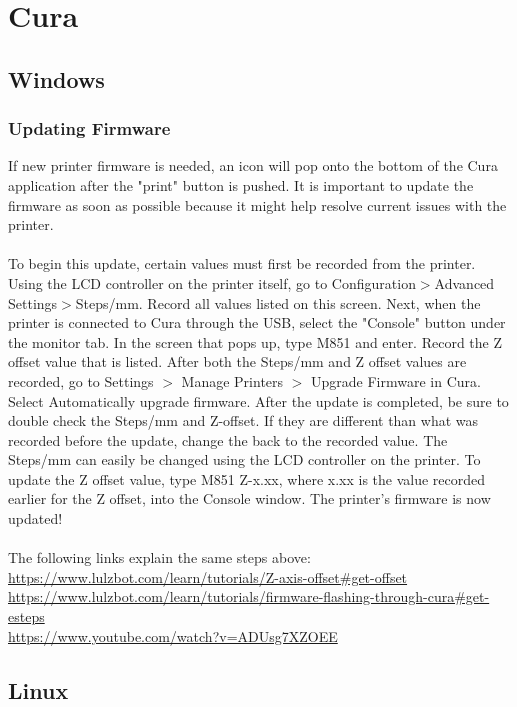 \documentclass{article}
\begin{document}
\section{Cura}

\subsection{Windows}

\subsubsection{Updating Firmware}

If new printer firmware is needed, an icon will pop onto the bottom of the Cura application after the "print" button is pushed. It is important to update the firmware as soon as possible because it might help resolve current issues with the printer. 
\\
\\To begin this update, certain values must first be recorded from the printer. Using the LCD controller on the printer itself, go to Configuration$>$Advanced Settings$>$Steps/mm. Record all values listed on this screen. Next, when the printer is connected to Cura through the USB, select the "Console" button under the monitor tab. In the screen that pops up, type M851 and enter. Record the Z offset value that is listed. After both the Steps/mm and Z offset values are recorded, go to Settings $>$ Manage Printers $>$ Upgrade Firmware in Cura. Select Automatically upgrade firmware. After the update is completed, be sure to double check the Steps/mm and Z-offset. If they are different than what was recorded before the update, change the back to the recorded value. The Steps/mm can easily be changed using the LCD controller on the printer. To update the Z offset value, type M851 Z-x.xx, where x.xx is the value recorded earlier for the Z offset, into the Console window. The printer's firmware is now updated!
\\
\\The following links explain the same steps above:\\
\url{https://www.lulzbot.com/learn/tutorials/Z-axis-offset#get-offset}\\
\url{https://www.lulzbot.com/learn/tutorials/firmware-flashing-through-cura#get-esteps}\\
\url{https://www.youtube.com/watch?v=ADUsg7XZOEE}

\subsection{Linux}
\end{document}
